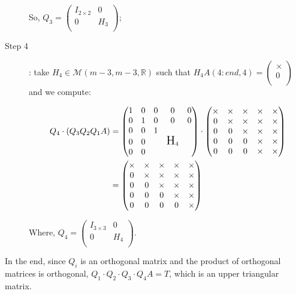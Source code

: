 \documentclass[computationalMathematics.tex]{subfiles}
\begin{document}
\begin{example}
\begin{description}
      So, $Q_{3} =
      \begin{pmatrix}
        I_{2 \times 2} & 0\\
        0 & H_{3}\\
      \end{pmatrix}$;

  \item[{\sc Step 4}]: take $H_{4} \in \mathcal{M}(m-3, m-3, \mathds{R})$ such that $H_{4}A(4:end, 4) = \begin{pmatrix} \times\\ 0\\ \end{pmatrix}$ and we compute:

   \begin{equation}
        \begin{aligned}
          Q_4 \cdot (Q_3 Q_2 Q_1 A)
          &=  \begin{pmatrix}
          1 & 0 & 0 & 0 & 0\\
          0 & 1 & 0 & 0 & 0\\
          0 & 0 & 1 & \\
          0 & 0 && \text{\Large H}_4\\
          0 & 0 &&\\
        \end{pmatrix} \cdot  \begin{pmatrix}
          \times & \times & \times & \times & \times\\
          0 & \times & \times & \times & \times\\
          0 & 0 & \times & \times & \times\\
          0 & 0 & 0 & \times & \times\\
          0 & 0 & 0 & \times & \times\\
        \end{pmatrix}\\
        &= \begin{pmatrix}
          \times & \times & \times & \times & \times\\
          0 & \times & \times & \times & \times\\
          0 & 0 & \times & \times & \times\\
          0 & 0 & 0 & \times & \times\\
          0 & 0 & 0 & 0 & \times\\
        \end{pmatrix}
        \end{aligned}
      \end{equation}

Where, $Q_{4} =
      \begin{pmatrix}
        I_{3 \times 3} & 0\\
        0 & H_{4}\\
      \end{pmatrix}$. 
\end{description}

  In the end, since $Q_{i}$ is an orthogonal matrix and the product of orthogonal matrices is orthogonal, $Q_{1} \cdot Q_{2} \cdot Q_{3} \cdot Q_{4} A = T$, which is an upper triangular matrix.
\end{example}
\end{document}
